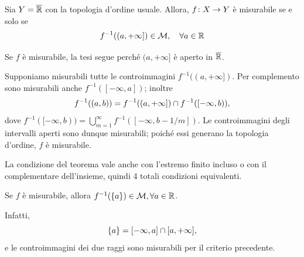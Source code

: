 \documentclass[a4paper]{article}
\begin{document}
\begin{radioactive}
\begin{snippettheorem}{}
    Sia \(Y = \overline {\mathbb{R}}\) con la topologia d'ordine usuale. Allora,
    \(f \colon X \to Y\) è misurabile se e solo se
    \[
        f^{-1}((a,+\infty]) \in \mathcal M, \quad \forall a \in \mathbb{R}
    \]
\end{snippettheorem}
\end{radioactive}

\begin{radioactive}
\begin{snippetproof}{}
    \begin{iffproof}
    \item Se \(f\) è misurabile, la tesi segue perché \((a,+\infty]\) è aperto in \(\overline{\mathbb{R}}\).
    \item Supponiamo misurabili tutte le controimmagini \(f^{-1}((a,+\infty])\).
        Per complemento sono misurabili anche \(f^{-1}([-\infty,a])\); inoltre
        \[
            f^{-1}((a,b))
            = f^{-1}((a,+\infty]) \cap f^{-1}([-\infty,b)),
        \]
        dove \(f^{-1}([-\infty,b))=\bigcup_{m=1}^\infty f^{-1}([-\infty,b-1/m])\).
        Le controimmagini degli intervalli aperti sono dunque misurabili; poiché essi generano la topologia d'ordine, \(f\) è misurabile.
    \end{iffproof}
\end{snippetproof}
\end{radioactive}

\begin{radioactive}
La condizione del teorema vale anche con l'estremo finito incluso o con il complementare
dell'insieme, quindi 4 totali condizioni equivalenti.
\end{radioactive}

\begin{radioactive}
\begin{snippetcorollary}{}
    Se \(f\) è misurabile, allora \(f^{-1}(\{a\}) \in \mathcal M, \forall a \in \mathbb{R}\).
\end{snippetcorollary}
\end{radioactive}

\begin{radioactive}
\begin{snippetproof}{}
    Infatti,
    \[
        \{a\} = [-\infty,a] \cap [a,+\infty],
    \]
    e le controimmagini dei due raggi sono misurabili per il criterio precedente.
\end{snippetproof}
\end{radioactive}
\end{document}
